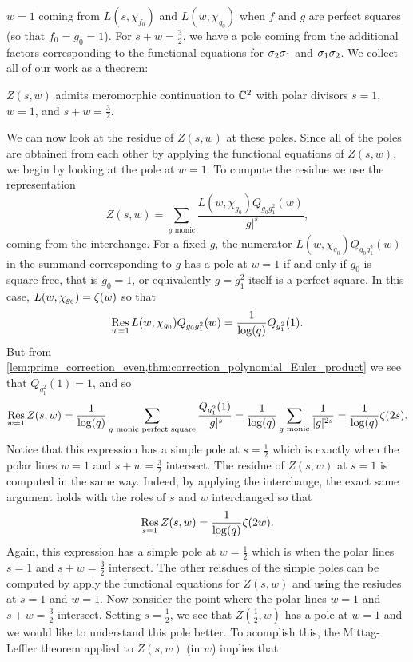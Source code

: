 \documentclass[12pt,reqno,oneside]{amsart}
\begin{document}
$w = 1$ coming from $L(s,\chi_{f_{0}})$ and $L(w,\chi_{g_{0}})$ when $f$ and $g$ are perfect squares (so that $f_{0} = g_{0} = 1$). For $s+w = \frac{3}{2}$, we have a pole coming from the additional factors corresponding to the functional equations for $\sigma_{2}\sigma_{1}$ and $\sigma_{1}\sigma_{2}$. We collect all of our work as a theorem:

    \begin{theorem}
        $Z(s,w)$ admits meromorphic continuation to $\mathbb{C}^{2}$ with polar divisors $s = 1$, $w = 1$, and $s+w = \frac{3}{2}$.
    \end{theorem}

    We can now look at the residue of $Z(s,w)$ at these poles. Since all of the poles are obtained from each other by applying the functional equations of $Z(s,w)$, we begin by looking at the pole at $w = 1$. To compute the residue we use the representation
    \[
        Z(s,w) = \sum_{\text{$g$ monic}}\frac{L(w,\chi_{g_{0}})Q_{g_{0}g_{1}^{2}}(w)}{|g|^{s}},
    \]
    coming from the interchange. For a fixed $g$, the numerator $L(w,\chi_{g_{0}})Q_{g_{0}g_{1}^{2}}(w)$ in the summand corresponding to $g$ has a pole at $w = 1$ if and only if $g_{0}$ is square-free, that is $g_{0} = 1$, or equivalently $g = g_{1}^{2}$ itself is a perfect square. In this case, $L(w,\chi_{g_{0}}) = \zeta(w)$ so that
    \[
        \operatorname*{\mathrm{Res}}_{w = 1}L(w,\chi_{g_{0}})Q_{g_{0}g_{1}^{2}}(w) = \frac{1}{\log(q)}Q_{g_{1}^{2}}(1).
    \]
    But from \cref{lem:prime_correction_even,thm:correction_polynomial_Euler_product} we see that $Q_{g_{1}^{2}}(1) = 1$, and so
    \[
        \operatorname*{\mathrm{Res}}_{w = 1}Z(s,w) = \frac{1}{\log(q)}\sum_{\text{$g$ monic perfect square}}\frac{Q_{g_{1}^{2}}(1)}{|g|^{s}} = \frac{1}{\log(q)}\sum_{\text{$g$ monic}}\frac{1}{|g|^{2s}} = \frac{1}{\log(q)}\zeta(2s).
    \]
    Notice that this expression has a simple pole at $s = \frac{1}{2}$ which is exactly when the polar lines $w = 1$ and $s+w = \frac{3}{2}$ intersect. The residue of $Z(s,w)$ at $s = 1$ is computed in the same way. Indeed, by applying the interchange, the exact same argument holds with the roles of $s$ and $w$ interchanged so that
    \[
        \operatorname*{\mathrm{Res}}_{s = 1}Z(s,w) = \frac{1}{\log(q)}\zeta(2w).
    \]
    Again, this expression has a simple pole at $w = \frac{1}{2}$ which is when the polar lines $s = 1$ and $s+w = \frac{3}{2}$ intersect. The other reisdues of the simple poles can be computed by apply the functional equations for $Z(s,w)$ and using the resiudes at $s = 1$ and $w = 1$. Now consider the point where the polar lines $w = 1$ and $s+w = \frac{3}{2}$ intersect. Setting $s = \frac{1}{2}$, we see that $Z\left(\frac{1}{2},w\right)$ has a pole at $w= 1$ and we would like to understand this pole better. To acomplish this, the Mittag-Leffler theorem applied to $Z(s,w)$ (in $w$) implies that
\end{document}
